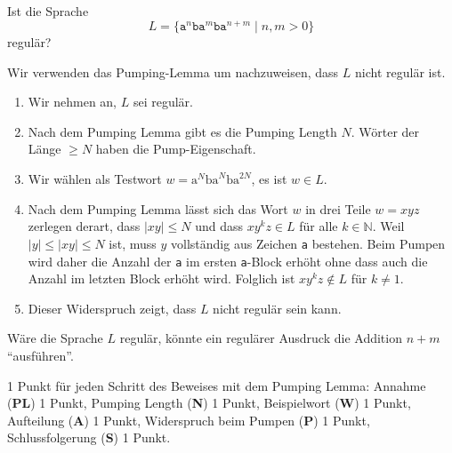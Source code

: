 Ist die Sprache
\[
L=\{\texttt{a}^n\texttt{ba}^m\texttt{ba}^{n+m}\mid n,m>0\}
\]
regulär?


\begin{loesung}
Wir verwenden das Pumping-Lemma um nachzuweisen, dass $L$ nicht 
regulär ist.
\begin{enumerate}
\item
Wir nehmen an, $L$ sei regulär.
\item
Nach dem Pumping Lemma gibt es die Pumping Length $N$.
Wörter der Länge $\ge N$ haben die Pump-Eigenschaft.
\item
Wir wählen als Testwort
$w = \text{a}^N\text{ba}^N\text{ba}^{2N}$, es ist $w\in L$.
\item
Nach dem Pumping Lemma lässt sich das Wort $w$ in drei Teile $w=xyz$
zerlegen derart, dass $|xy|\le N$ und dass $xy^kz\in L$ für alle
$k\in\mathbb N$.
Weil $|y| \le |xy|\le N$ ist, muss $y$ vollständig aus Zeichen
\texttt{a} bestehen.
Beim Pumpen wird daher die Anzahl der \texttt{a} im ersten \texttt{a}-Block
erhöht ohne dass auch die Anzahl im letzten Block erhöht wird.
Folglich ist $xy^kz\not\in L$ für $k\ne 1$.
\item
Dieser Widerspruch zeigt, dass $L$ nicht regulär sein kann.
\qedhere
\end{enumerate}
\end{loesung}


\begin{diskussion}
Wäre die Sprache $L$ regulär, könnte ein regulärer Ausdruck die
Addition $n+m$ ``ausführen''.
\end{diskussion}

\begin{bewertung} 1 Punkt für jeden Schritt des Beweises mit dem
Pumping Lemma:
Annahme ({\bf PL}) 1 Punkt,
Pumping Length ({\bf N}) 1 Punkt,
Beispielwort ({\bf W}) 1 Punkt,
Aufteilung ({\bf A}) 1 Punkt,
Widerspruch beim Pumpen ({\bf P}) 1 Punkt,
Schlussfolgerung ({\bf S}) 1 Punkt.
\end{bewertung}

